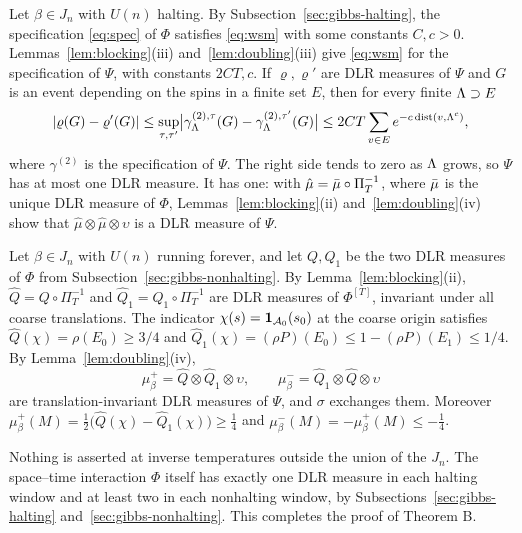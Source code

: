 Let \(\beta\in J_n\) with \(U(n)\) halting. By Subsection~\ref{sec:gibbs-halting}, the specification \eqref{eq:spec} of \(\Phi\) satisfies \eqref{eq:wsm} with some constants \(C,c>0\). Lemmas~\ref{lem:blocking}(iii) and~\ref{lem:doubling}(iii) give \eqref{eq:wsm} for the specification of \(\Psi\), with constants \(2CT,c\). If \(\varrho,\varrho'\) are DLR measures of \(\Psi\) and \(G\) is an event depending on the spins in a finite set \(E\), then for every finite \(\Lambda\supset E\)
\[
|\varrho(G)-\varrho'(G)|\le\sup_{\tau,\tau'}\bigl|\gamma^{(2),\tau}_\Lambda(G)-\gamma^{(2),\tau'}_\Lambda(G)\bigr|\le2CT\sum_{v\in E}e^{-c\operatorname{dist}(v,\Lambda^c)},
\]
where \(\gamma^{(2)}\) is the specification of \(\Psi\). The right side tends to zero as \(\Lambda\) grows, so \(\Psi\) has at most one DLR measure. It has one: with \(\hat\mu=\bar\mu\circ\Pi_T^{-1}\), where \(\bar\mu\) is the unique DLR measure of \(\Phi\), Lemmas~\ref{lem:blocking}(ii) and~\ref{lem:doubling}(iv) show that \(\hat\mu\otimes\hat\mu\otimes\upsilon\) is a DLR measure of \(\Psi\).

Let \(\beta\in J_n\) with \(U(n)\) running forever, and let \(Q,Q_1\) be the two DLR measures of \(\Phi\) from Subsection~\ref{sec:gibbs-nonhalting}. By Lemma~\ref{lem:blocking}(ii), \(\hat Q=Q\circ\Pi_T^{-1}\) and \(\hat Q_1=Q_1\circ\Pi_T^{-1}\) are DLR measures of \(\Phi^{[T]}\), invariant under all coarse translations. The indicator \(\chi(s)=\mathbf 1_{\mathcal A_0}(s_0)\) at the coarse origin satisfies \(\hat Q(\chi)=\rho(E_0)\ge3/4\) and \(\hat Q_1(\chi)=(\rho P)(E_0)\le1-(\rho P)(E_1)\le1/4\). By Lemma~\ref{lem:doubling}(iv),
\[
\mu^+_\beta=\hat Q\otimes\hat Q_1\otimes\upsilon,\qquad
\mu^-_\beta=\hat Q_1\otimes\hat Q\otimes\upsilon
\]
are translation-invariant DLR measures of \(\Psi\), and \(\sigma\) exchanges them. Moreover \(\mu^+_\beta(M)=\tfrac12\bigl(\hat Q(\chi)-\hat Q_1(\chi)\bigr)\ge\tfrac14\) and \(\mu^-_\beta(M)=-\mu^+_\beta(M)\le-\tfrac14\).

Nothing is asserted at inverse temperatures outside the union of the \(J_n\). The space--time interaction \(\Phi\) itself has exactly one DLR measure in each halting window and at least two in each nonhalting window, by Subsections~\ref{sec:gibbs-halting} and~\ref{sec:gibbs-nonhalting}. This completes the proof of Theorem B.
